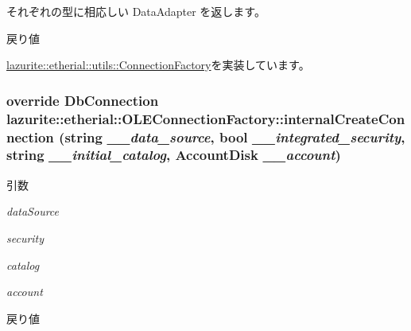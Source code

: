 それぞれの型に相応しい DataAdapter を返します。 \begin{DoxyReturn}{戻り値}

\end{DoxyReturn}


\hyperlink{classlazurite_1_1etherial_1_1utils_1_1_connection_factory_a5980a0a44f55a60cf4b991920d7f8529}{lazurite::etherial::utils::ConnectionFactory}を実装しています。\hypertarget{classlazurite_1_1etherial_1_1_o_l_e_connection_factory_aa149a9d42af61c87fd73c516bbe43384}{
\subsubsection[{internalCreateConnection}]{\setlength{\rightskip}{0pt plus 5cm}override DbConnection lazurite::etherial::OLEConnectionFactory::internalCreateConnection (string {\em \_\-\_\-data\_\-source}, \/  bool {\em \_\-\_\-integrated\_\-security}, \/  string {\em \_\-\_\-initial\_\-catalog}, \/  {\bf AccountDisk} {\em \_\-\_\-account})}}
\label{classlazurite_1_1etherial_1_1_o_l_e_connection_factory_aa149a9d42af61c87fd73c516bbe43384}

\begin{DoxyParams}{引数}
\item[{\em dataSource}]\item[{\em security}]\item[{\em catalog}]\item[{\em account}]\end{DoxyParams}
\begin{DoxyReturn}{戻り値}

\end{DoxyReturn}


